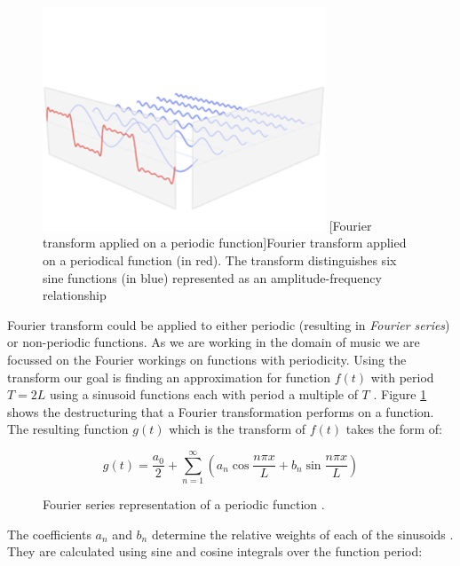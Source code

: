 \begin{figure}[H]
    \centering
    \includegraphics[width=0.75\textwidth]{BackgroundTheory/fourier-series.png}
    [Fourier transform applied on a periodic function]{Fourier transform applied on a periodical function (in red). The transform distinguishes six sine functions (in blue) represented as an amplitude-frequency relationship \cite{fourierseries}}
    \label{fig:fourierseriesimage}
\end{figure}

Fourier transform could be applied to either periodic (resulting in
\textit{Fourier series}) or non-periodic functions. As we are working in the
domain of music we are focussed on the Fourier workings on functions with
periodicity. Using the transform our goal is finding an approximation for
function $f(t)$ with period $T=2L$ using a sinusoid functions each with period a
multiple of $T$ \cite{fourierseries}. Figure \ref{fig:fourierseriesimage} shows
the destructuring that a Fourier transformation performs on a function. The
resulting function $g(t)$ which is the transform of $f(t)$ takes the form of:

\begin{figure}[H]
    \label{fig:fourierseriesequation}
    \begin{equation}
        g(t) = \frac{a_0}{2} + \sum_{n=1}^{\infty}({a_n}\cos\frac{n{\pi}x}{L} + {b_n}\sin\frac{n{\pi}x}{L})
    \end{equation}
    \caption[Fourier transformation equation for periodic functions]{Fourier series representation of a periodic function \cite{fourierequations}.}
\end{figure}

The coefficients $a_n$ and $b_n$ determine the relative weights of each of the
sinusoids \cite{fourierseries}. They are calculated using sine and cosine
integrals over the function period:

